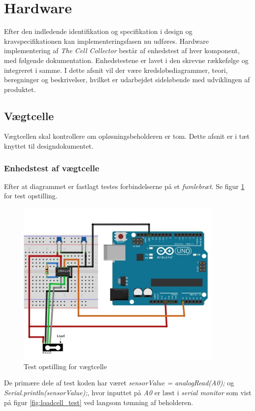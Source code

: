   \section{Hardware}
Efter den indledende identifikation og specifikation i design og kravspecifikationen kan implementeringsfasen nu udføres. Hardware implementering af \textit{The Cell Collector} består af enhedstest af hver komponent, med følgende dokumentation. Enhedstestene er lavet i den skrevne rækkefølge og integreret i samme. I dette afsnit vil der være kredsløbsdiagrammer, teori, beregninger og beskrivelser, hvilket er udarbejdet sideløbende med udviklingen af produktet. 
 	
 \subsection{Vægtcelle}
Vægtcellen skal kontrollere om opløsningsbeholderen er tom. Dette afsnit er i tæt knyttet til designdokumentet.

\subsubsection{Enhedstest af vægtcelle }

Efter at diagrammet er fastlagt testes forbindelserne på et \textit{fumlebræt}. Se figur \ref{fig:loadcelltest} for test opstilling.

  \begin{figure}[H]
	\centering
	\includegraphics[width=0.9\textwidth]{billeder/Hardware/diagrammer/Drawing1.jpg}
	\caption{Test opstilling for vægtcelle}
	\label{fig:loadcelltest}
\end{figure}
De primære dele af test koden har været  \textit{sensorValue = analogRead(A0);} og \textit{Serial.println(sensorValue);}, hvor inputtet på \textit{A0} er læst i \textit{serial monitor} som vist på figur \ref{fig:loadcell_test} ved langsom tømning af beholderen.

